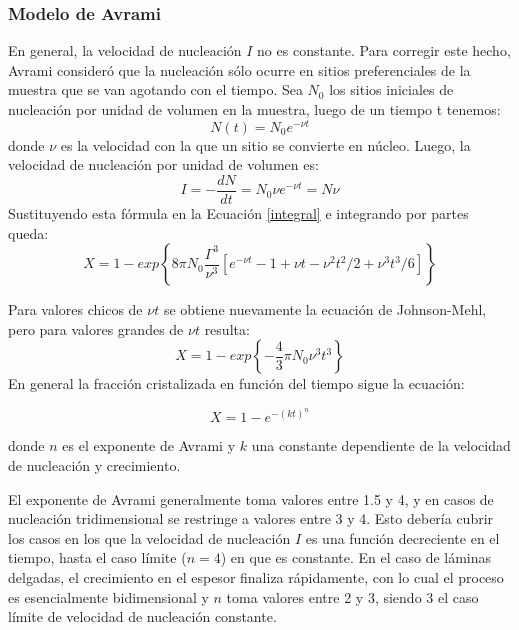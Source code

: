 \documentclass[12pt]{article}
\theoremstyle{definition}
\theoremstyle{remark}
\begin{document}
\subsubsection{Modelo de Avrami}
En general, la velocidad de nucleación $I$ no es constante. Para corregir este hecho, Avrami consideró que la nucleación sólo ocurre en sitios preferenciales de la muestra que se van agotando con el tiempo. Sea $N_0$ los sitios iniciales de nucleación por unidad de volumen en la muestra, luego de un tiempo t tenemos:
\begin{equation}
	N(t) = N_0e^{-\nu t}
\end{equation}
donde $\nu$ es la velocidad con la que un sitio se convierte en núcleo. Luego, la velocidad de nucleación por unidad de volumen es:
\begin{equation}
	I = -\frac{dN}{dt} = N_0\nu e^{-\nu t} = N\nu
\end{equation}
Sustituyendo esta fórmula en la Ecuación \ref{integral} e integrando por partes queda:
\begin{equation}
	X = 1-exp \left\lbrace 8\pi N_0\frac{\Gamma^3}{\nu^3} \left[ e^{-\nu t} -1+\nu t -\nu^2t^2/2 + \nu^3 t^3/6 \right] \right\rbrace
\end{equation}

Para valores chicos de $\nu t$ se obtiene nuevamente la ecuación de Johnson-Mehl, pero para valores grandes de $\nu t$ resulta:
\begin{equation}
	X = 1 - exp\left\lbrace -\frac{4}{3} \pi N_0 \nu^3 t^3 \right\rbrace
\end{equation}
En general la fracción cristalizada en función del tiempo sigue la ecuación:

\begin{equation}
	X = 1 - e^{-(kt)^n}
\end{equation}

donde $n$ es el exponente de Avrami y $k$ una constante dependiente de la velocidad de nucleación y crecimiento.

	El exponente de Avrami generalmente toma valores entre 1.5 y 4, y en casos de nucleación tridimensional se restringe a valores entre 3 y 4. Esto debería cubrir los casos en los que la velocidad de nucleación $I$ es una función decreciente en el tiempo, hasta el caso límite ($n = 4$) en que es constante. En el caso de láminas delgadas, el crecimiento en el espesor finaliza rápidamente, con lo cual el proceso es esencialmente bidimensional y $n$ toma valores entre 2 y 3, siendo 3 el caso límite de velocidad de nucleación constante. 
	
\end{document}
